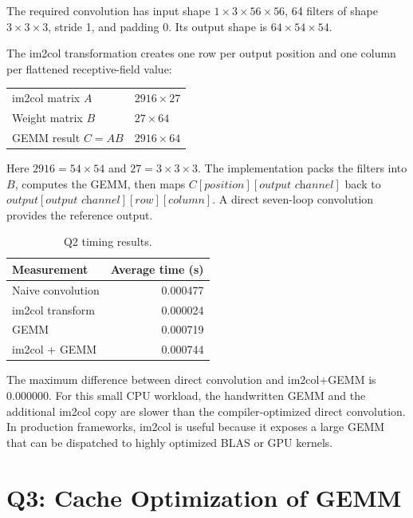 \documentclass[11pt]{article}
\begin{document}
The required convolution has input shape $1 \times 3 \times 56 \times 56$, 64 filters of shape $3 \times 3 \times 3$, stride 1, and padding 0. Its output shape is $64 \times 54 \times 54$.

The im2col transformation creates one row per output position and one column per flattened receptive-field value:

\begin{center}
\begin{tabular}{ll}
\toprule
im2col matrix $A$ & $2916 \times 27$ \\
Weight matrix $B$ & $27 \times 64$ \\
GEMM result $C=AB$ & $2916 \times 64$ \\
\bottomrule
\end{tabular}
\end{center}

Here $2916=54 \times 54$ and $27=3 \times 3 \times 3$. The implementation packs the filters into $B$, computes the GEMM, then maps $C[\textit{position}][\textit{output channel}]$ back to $\textit{output}[\textit{output channel}][\textit{row}][\textit{column}]$. A direct seven-loop convolution provides the reference output.

\begin{table}[h]
\centering
\caption{Q2 timing results.}\label{tab:q2}
\begin{tabular}{lr}
\toprule
Measurement & Average time (s) \\
\midrule
Naive convolution & 0.000477 \\
im2col transform & 0.000024 \\
GEMM & 0.000719 \\
im2col + GEMM & 0.000744 \\
\bottomrule
\end{tabular}
\end{table}

The maximum difference between direct convolution and im2col+GEMM is 0.000000. For this small CPU workload, the handwritten GEMM and the additional im2col copy are slower than the compiler-optimized direct convolution. In production frameworks, im2col is useful because it exposes a large GEMM that can be dispatched to highly optimized BLAS or GPU kernels.

\section{Q3: Cache Optimization of GEMM}
\end{document}
